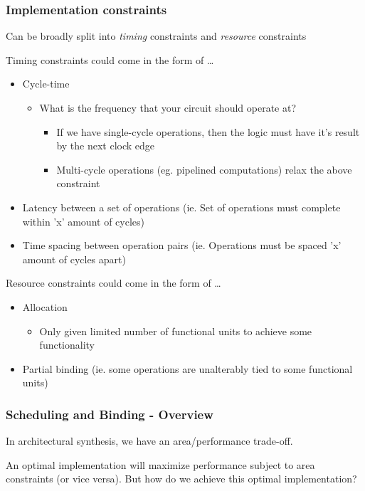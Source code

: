 \documentclass{article}
\begin{document}
\subsubsection{Implementation constraints}
Can be broadly split into \textit{timing} constraints and \textit{resource} constraints

Timing constraints could come in the form of \dots
\begin{itemize}
    \item Cycle-time
        \begin{itemize}
            \item What is the frequency that your circuit should operate at?
                \begin{itemize}
                    \item If we have single-cycle operations, then the logic must have it's result by the next clock edge
                    \item Multi-cycle operations (eg. pipelined computations) relax the above constraint
                \end{itemize}
        \end{itemize}
    \item Latency between a set of operations (ie. Set of operations must complete within 'x' amount of cycles)
    \item Time spacing between operation pairs (ie. Operations must be spaced 'x' amount of cycles apart)
\end{itemize}

Resource constraints could come in the form of \dots
\begin{itemize}
    \item Allocation
        \begin{itemize}
            \item Only given limited number of functional units to achieve some functionality
        \end{itemize}
    \item Partial binding (ie. some operations are unalterably tied to some functional units)
\end{itemize}

\subsubsection{Scheduling and Binding - Overview}
In architectural synthesis, we have an area/performance trade-off.

An optimal implementation will maximize performance subject to area constraints (or vice versa). But how do we achieve this optimal implementation?
\end{document}
